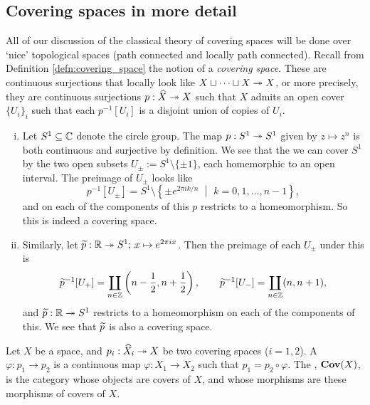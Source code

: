 \subsection{Covering spaces in more detail}
\label{subsec:3_2_covering_spaces_in_detail}
All of our discussion of the classical theory of covering spaces will be done over `nice' topological spaces (path connected and locally path connected). Recall from Definition \ref{defn:covering_space} the notion of a \emph{covering space}. These are continuous surjections that locally look like $X \sqcup \cdots \sqcup X \twoheadrightarrow X$, or more precisely, they are continuous surjections $p : \widehat{X} \twoheadrightarrow X$ such that $X$ admits an open cover $\{U_i\}_i$ such that each $p^{-1}[U_i]$ is a disjoint union of copies of $U_i$.

\begin{eg}
	\begin{enumerate}[(i)]
		\item Let $S^1 \subseteq \mathbb{C}$ denote the circle group. The map $p: S^1 \twoheadrightarrow S^1$ given by $z \mapsto z^n$ is both continuous and surjective by definition. We see that the we can cover $S^1$ by the two open subsets $U_{\pm} := S^1 \setminus \{\pm 1\}$, each homemorphic to an open interval. The preimage of $U_{\pm}$ looks like 
		\[
			p^{-1}[U_{\pm}] = S^1 \setminus \left\{\pm e^{2 \pi i k/n} \,\,\middle|\,\, k =0,1,\ldots, n-1\right\},
		\]
		and on each of the components of this $p$ restricts to a homeomorphism. So this is indeed a covering space.
		\item Similarly, let $\widetilde{p} : \mathbb{R} \twoheadrightarrow S^1;\, x \mapsto e^{2\pi i x}$. Then the preimage of each $U_{\pm}$ under this is 
			\[
				\widetilde{p}^{-1}[U_{+}] = \coprod_{n \in \mathbb{Z}} \left(n-\frac{1}{2}, n + \frac{1}{2}\right), \qquad \widetilde{p}^{-1}[U_{-}] = \coprod_{n\in \mathbb{Z}} (n, n+1),
			\]
			and $\widetilde{p} : \mathbb{R} \twoheadrightarrow S^1$ restricts to a homeomorphism on each of the components of this. We see that $\widetilde{p}$ is also a covering space. \qedhere
	\end{enumerate}
\end{eg}

\begin{defn}
	Let $X$ be a space, and $p_i : \widehat{X}_i \twoheadrightarrow X$ be two covering spaces ($i=1,2$). A  $\varphi : p_1 \to p_2$ is a continuous map $\varphi : X_1 \to X_2$ such that $p_1 = p_2 \circ \varphi$. The , $\mathbf{Cov}(X)$, is the category whose objects are covers of $X$, and whose morphisms are these morphisms of covers of $X$.
\end{defn}

